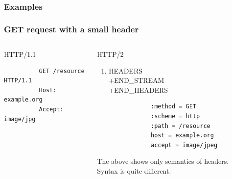 \documentclass[lualatex]{beamer}
\begin{document}
\subsubsection{Examples}

\begin{frame}[fragile]
  \frametitle{GET request with a small header}

  \begin{columns}[t]
    \begin{column}{.45\textwidth}
      \begin{block}{HTTP/1.1}
        \begin{verbatim}
          GET /resource HTTP/1.1
          Host: example.org
          Accept: image/jpg
        \end{verbatim}
      \end{block}
    \end{column}
    \begin{column}{.45\textwidth}
      \begin{block}{HTTP/2}
        \begin{enumerate}
        \item HEADERS\\+END\_STREAM\\+END\_HEADERS
          \begin{verbatim}
            :method = GET
            :scheme = http
            :path = /resource
            host = example.org
            accept = image/jpeg
          \end{verbatim}
        \end{enumerate}
        The above shows only semantics of headers.
        Syntax is quite different.
      \end{block}
    \end{column}
  \end{columns}
\end{frame}
\end{document}
